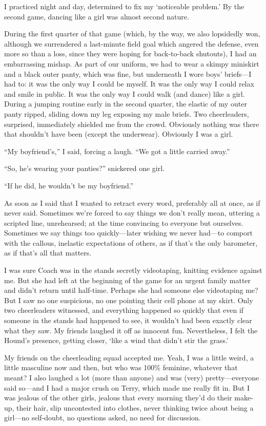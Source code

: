 I practiced night and day, determined to fix my `noticeable problem.' By
the second game, dancing like a girl was almost second nature.

During the first quarter of that game (which, by the way, we also
lopsidedly won, although we surrendered a last-minute field goal which
angered the defense, even more so than a loss, since they were hoping
for back-to-back shutouts), I had an embarrassing mishap. As part of our
uniform, we had to wear a skimpy miniskirt and a black outer panty,
which was fine, but underneath I wore boys' briefs---I had to: it was
the only way I could be myself. It was the only way I could relax and
smile in public. It was the only way I could walk (and dance) like a
girl. During a jumping routine early in the second quarter, the elastic
of my outer panty ripped, sliding down my leg exposing my male briefs.
Two cheerleaders, surprised, immediately shielded me from the crowd.
Obviously nothing was there that shouldn't have been (except the
underwear). Obviously I was a girl.

``My boyfriend's,'' I said, forcing a laugh. ``We got a little carried
away.''

``So, he's wearing your panties?'' snickered one girl.

``If he did, he wouldn't be my boyfriend.''

As soon as I said that I wanted to retract every word, preferably all at
once, as if never said. Sometimes we're forced to say things we don't
really mean, uttering a scripted line, unrehearsed; at the time
convincing to everyone but ourselves. Sometimes we say things too
quickly---later wishing we never had---to comport with the callous,
inelastic expectations of others, as if that's the only barometer, as if
that's all that matters.

I was sure Coach was in the stands secretly videotaping, knitting
evidence against me. But she had left at the beginning of the game for
an urgent family matter and didn't return until half-time. Perhaps she
had someone else videotaping me? But I saw no one suspicious, no one
pointing their cell phone at my skirt. Only two cheerleaders witnessed,
and everything happened so quickly that even if someone in the stands
had happened to see, it wouldn't had been exactly clear what they saw.
My friends laughed it off as innocent fun. Nevertheless, I felt the
Hound's presence, getting closer, `like a wind that didn't stir the
grass.'

My friends on the cheerleading squad accepted me. Yeah, I was a little
weird, a little masculine now and then, but who was 100\% feminine,
whatever that meant? I also laughed a lot (more than anyone) and was
(very) pretty---everyone said so---and I had a major crush on Terry,
which made me really fit in. But I was jealous of the other girls,
jealous that every morning they'd do their make-up, their hair, slip
uncontested into clothes, never thinking twice about being a girl---no
self-doubt, no questions asked, no need for discussion.


